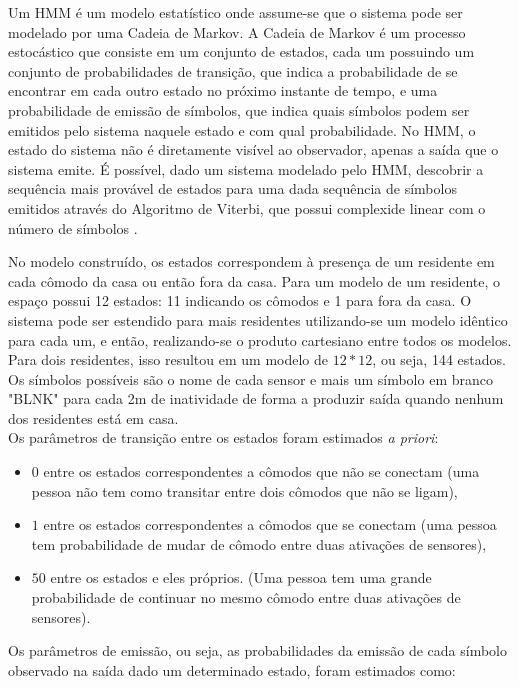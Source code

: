 \documentclass[
	12pt,				%
	openright,			%
	twoside,			%
	a4paper,			%
	english,			%
	spanish,			%
	brazil,				%
	]{abntex2}\usepackage[]{graphicx}\usepackage[]{color}
\begin{document}
Um HMM é um modelo estatístico onde assume-se que o sistema pode ser modelado por uma Cadeia de Markov. A Cadeia de Markov é um processo estocástico que consiste em um conjunto de estados, cada um possuindo um conjunto de probabilidades de transição, que indica a probabilidade de se encontrar em cada outro estado no próximo instante de tempo, e uma probabilidade de emissão de símbolos, que indica quais símbolos podem ser emitidos pelo sistema naquele estado e com qual probabilidade. No HMM, o estado do sistema não é diretamente visível ao observador, apenas a saída que o sistema emite. É possível, dado um sistema modelado pelo HMM, descobrir a sequência mais provável de estados para uma dada sequência de símbolos emitidos através do Algoritmo de Viterbi, que possui complexide linear com o número de símbolos \cite{GHAHRAMANI2001}.

No modelo construído, os estados correspondem à presença de um residente em cada cômodo da casa ou então fora da casa. Para um modelo de um residente, o espaço possui 12 estados: 11 indicando os cômodos e 1 para fora da casa. O sistema pode ser estendido para mais residentes utilizando-se um modelo idêntico para cada um, e então, realizando-se o produto cartesiano entre todos os modelos. Para dois residentes, isso resultou em um modelo de $12*12$, ou seja, 144 estados. Os símbolos possíveis são o nome de cada sensor e mais um símbolo em branco "BLNK" para cada 2m de inatividade de forma a produzir saída quando nenhum dos residentes está em casa.\\

Os parâmetros de transição entre os estados foram estimados \textit{a priori}:

\begin{itemize}
	\item $0$ entre os estados correspondentes a cômodos que não se conectam (uma pessoa não tem como transitar entre dois cômodos que não se ligam), \\
	\item $1$ entre os estados correspondentes a cômodos que se conectam (uma pessoa tem probabilidade de mudar de cômodo entre duas ativações de sensores),\\
	\item $50$ entre os estados e eles próprios. (Uma pessoa tem uma grande probabilidade de continuar no mesmo cômodo entre duas ativações de sensores). \\
\end{itemize}

 
Os parâmetros de emissão, ou seja, as probabilidades da emissão de cada símbolo observado na saída dado um determinado estado, foram estimados como:
\end{document}
